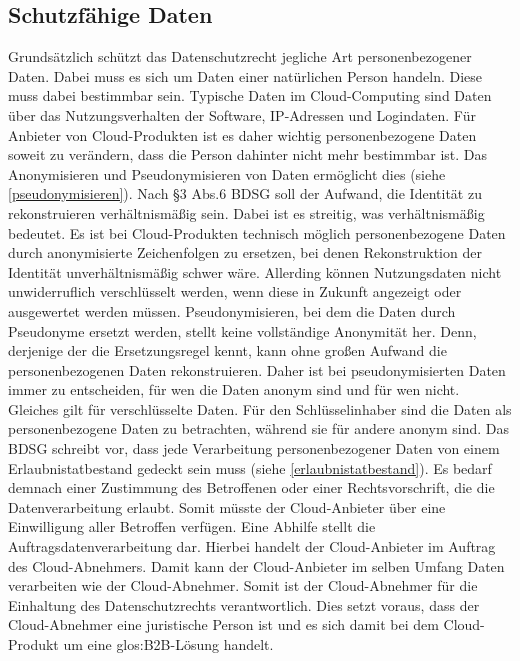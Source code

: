     \subsection{Schutzf\"ahige Daten}
Grunds\"atzlich sch\"utzt das Datenschutzrecht jegliche Art personenbezogener Daten. Dabei muss es sich um Daten einer nat\"urlichen Person handeln. Diese muss dabei bestimmbar sein. Typische Daten im Cloud-Computing sind Daten \"uber das Nutzungsverhalten der Software, IP-Adressen und Logindaten. F\"ur Anbieter von Cloud-Produkten ist es daher wichtig personenbezogene Daten soweit zu ver\"andern, dass die Person dahinter nicht mehr bestimmbar ist. Das Anonymisieren und Pseudonymisieren von Daten erm\"oglicht dies (siehe \vref{pseudonymisieren}). 
Nach §3 Abs.6 BDSG soll der Aufwand, die Identit\"at zu rekonstruieren verh\"altnism\"a{\ss}ig sein. Dabei ist es streitig, was verh\"altnism\"a{\ss}ig bedeutet. Es ist bei Cloud-Produkten technisch m\"oglich personenbezogene Daten durch anonymisierte Zeichenfolgen zu ersetzen, bei denen Rekonstruktion der Identit\"at unverh\"altnism\"a{\ss}ig schwer w\"are. Allerding k\"onnen Nutzungsdaten nicht unwiderruflich verschl\"usselt werden, wenn diese in Zukunft angezeigt oder ausgewertet werden m\"ussen. Pseudonymisieren, bei dem die Daten durch Pseudonyme ersetzt werden, stellt keine vollst\"andige Anonymit\"at her. Denn, derjenige der die Ersetzungsregel kennt, kann ohne gro{\ss}en Aufwand die personenbezogenen Daten rekonstruieren. Daher ist bei pseudonymisierten Daten immer zu entscheiden, f\"ur wen die Daten anonym sind und f\"ur wen nicht. Gleiches gilt f\"ur verschl\"usselte Daten. F\"ur den Schl\"usselinhaber sind die Daten als personenbezogene Daten zu betrachten, w\"ahrend sie f\"ur andere anonym sind.\newline
Das BDSG schreibt vor, dass jede Verarbeitung personenbezogener Daten von einem Erlaubnistatbestand gedeckt sein muss (siehe \vref{erlaubnistatbestand}). Es bedarf demnach einer Zustimmung des Betroffenen oder einer Rechtsvorschrift, die die Datenverarbeitung erlaubt. Somit m\"usste der Cloud-Anbieter \"uber eine Einwilligung aller Betroffen verf\"ugen. Eine Abhilfe stellt die Auftragsdatenverarbeitung dar. Hierbei handelt der Cloud-Anbieter im Auftrag des Cloud-Abnehmers. Damit kann der Cloud-Anbieter im selben Umfang Daten verarbeiten wie der Cloud-Abnehmer. Somit ist der Cloud-Abnehmer f\"ur die Einhaltung des Datenschutzrechts verantwortlich. Dies setzt voraus, dass der Cloud-Abnehmer eine juristische Person ist und es sich damit bei dem Cloud-Produkt um eine \gls{glos:B2B}-L\"osung handelt.\newline

